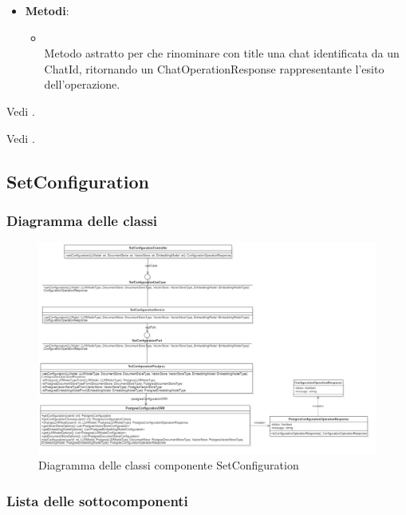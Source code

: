 \documentclass[10pt, a4paper]{article}
\begin{document}
\label{RenameChatUseCaseDettaglio}
\begin{itemize}
    \item \textbf{Metodi}:
    \begin{itemize}
        \item {}\\
        Metodo astratto per che rinominare con title una chat identificata da un ChatId, ritornando un ChatOperationResponse rappresentante l'esito dell'operazione.
    \end{itemize}
\end{itemize}


Vedi .



Vedi .


\subsection{SetConfiguration}
\subsubsection{Diagramma delle classi}
\begin{figure}[H]
    \centering        
    \includegraphics[width=16.5cm]{img/SetConfiguration.png}
    \caption{Diagramma delle classi componente SetConfiguration}
\end{figure}

\subsubsection{Lista delle sottocomponenti}
\end{document}
